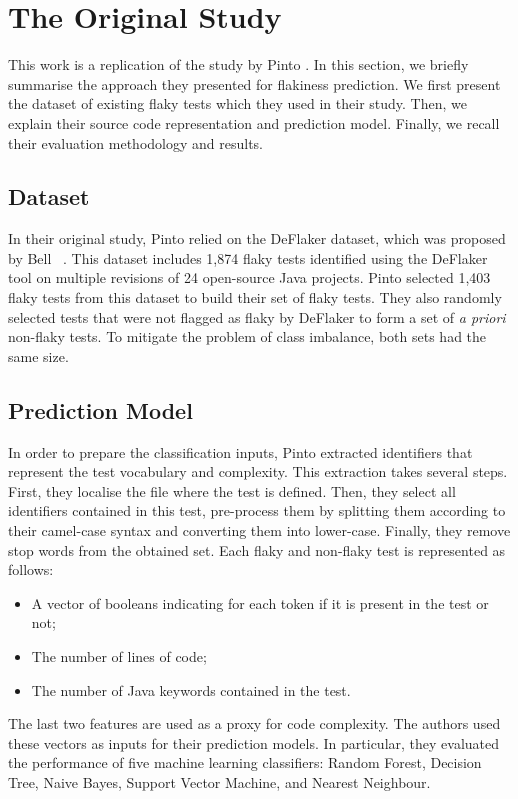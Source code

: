 \section{The Original Study}
\label{sec:replication-pinto}

This work is a replication of the study by Pinto \etal \cite{Pinto2020}. 
In this section, we briefly summarise the approach they presented for flakiness prediction. 
We first present the dataset of existing flaky tests which they used in their study. Then, we explain their source code representation and prediction model. 
Finally, we recall their evaluation methodology and results. 

\subsection{Dataset}
In their original study, Pinto \etal relied on the DeFlaker dataset, which was proposed by Bell \etal~\cite{Bell2018}. 
This dataset includes 1,874 flaky tests identified using the DeFlaker tool on multiple revisions of 24 open-source Java projects.
Pinto \etal selected 1,403 flaky tests from this dataset to build their set of flaky tests.
They also randomly selected tests that were not flagged as flaky by DeFlaker to form a set of \textit{a priori} non-flaky tests. 
To mitigate the problem of class imbalance, both sets had the same size. 

\subsection{Prediction Model}
In order to prepare the classification inputs, Pinto \etal extracted identifiers that represent the test vocabulary and complexity. 
This extraction takes several steps. First, they localise the file where the test is defined. Then, they select all identifiers contained in this test, pre-process them by splitting them according to their camel-case syntax and converting them into lower-case. Finally, they remove stop words from the obtained set. Each flaky and non-flaky test is represented as follows:
\begin{itemize}
    \item A vector of booleans indicating for each token if it is present in the test or not;
    \item The number of lines of code;
    \item The number of Java keywords contained in the test.
\end{itemize}  
The last two features are used as a proxy for code complexity.
The authors used these vectors as inputs for their prediction models.
In particular, they evaluated the performance of five machine learning classifiers: Random Forest, Decision Tree, Naive Bayes, Support Vector Machine, and Nearest Neighbour. 
